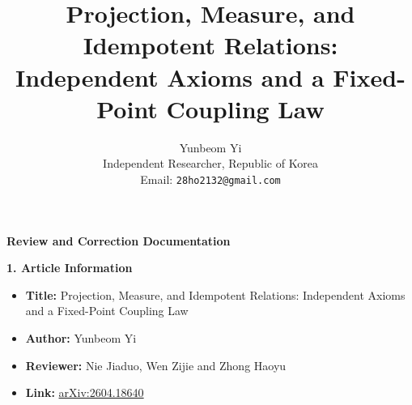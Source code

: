 \documentclass[11pt]{article}
\title{\textbf{Projection, Measure, and Idempotent Relations:\\
Independent Axioms and a Fixed-Point Coupling Law}}
\author{
Yunbeom Yi\\[4pt]
\small Independent Researcher, Republic of Korea\\
\small Email: \texttt{28ho2132@gmail.com}
}
\date{}
\numberwithin{equation}{section}
\theoremstyle{definition}
\begin{document}
\begin{titlepage}
    \centering
    \vspace*{2cm}
    
    {\Huge \bfseries Review and Correction Documentation\par} 
    \vspace{1.5cm}
    
    \begin{flushleft}
        \large \textbf{1. Article Information} \\[0.5cm]
        \normalsize
        \begin{itemize}[leftmargin=2cm]
            \item \textbf{Title:} Projection, Measure, and Idempotent Relations: Independent Axioms and a Fixed-Point Coupling Law
            \item \textbf{Author:} Yunbeom Yi
            \item \textbf{Reviewer:} Nie Jiaduo, Wen Zijie and Zhong Haoyu
            \item \textbf{Link:} \href{arxiv.org/abs/2604.18640}{arXiv:2604.18640}
        \end{itemize}
    \end{flushleft}
    

\end{titlepage}
\end{document}
